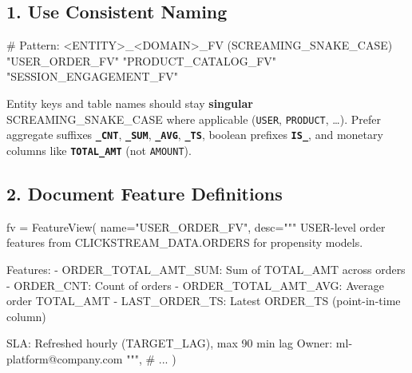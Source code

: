 \documentclass[
  letterpaper,
  DIV=11,
  numbers=noendperiod]{scrreprt}
\newenvironment{Shaded}{\begin{snugshade}}{\end{snugshade}}
\newcommand{\CommentTok}[1]{\textcolor[rgb]{0.37,0.37,0.37}{#1}}
\newcommand{\NormalTok}[1]{\textcolor[rgb]{0.00,0.23,0.31}{#1}}
\newcommand{\OperatorTok}[1]{\textcolor[rgb]{0.37,0.37,0.37}{#1}}
\newcommand{\StringTok}[1]{\textcolor[rgb]{0.13,0.47,0.30}{#1}}
\begin{document}
\hypertarget{use-consistent-naming}{%
\subsection{1. Use Consistent Naming}\label{use-consistent-naming}}

\begin{Shaded}
\begin{Highlighting}[]
\CommentTok{\# Pattern: \textless{}ENTITY\textgreater{}\_\textless{}DOMAIN\textgreater{}\_FV (SCREAMING\_SNAKE\_CASE)}
\CommentTok{"USER\_ORDER\_FV"}
\CommentTok{"PRODUCT\_CATALOG\_FV"}
\CommentTok{"SESSION\_ENGAGEMENT\_FV"}
\end{Highlighting}
\end{Shaded}

Entity keys and table names should stay \textbf{singular}
SCREAMING\_SNAKE\_CASE where applicable (\texttt{USER},
\texttt{PRODUCT}, \ldots). Prefer aggregate suffixes
\textbf{\texttt{\_CNT}}, \textbf{\texttt{\_SUM}},
\textbf{\texttt{\_AVG}}, \textbf{\texttt{\_TS}}, boolean prefixes
\textbf{\texttt{IS\_}}, and monetary columns like
\textbf{\texttt{TOTAL\_AMT}} (not \texttt{AMOUNT}).

\hypertarget{document-feature-definitions}{%
\subsection{2. Document Feature
Definitions}\label{document-feature-definitions}}

\begin{Shaded}
\begin{Highlighting}[]
\NormalTok{fv }\OperatorTok{=}\NormalTok{ FeatureView(}
\NormalTok{    name}\OperatorTok{=}\StringTok{"USER\_ORDER\_FV"}\NormalTok{,}
\NormalTok{    desc}\OperatorTok{=}\StringTok{"""}
\StringTok{    USER{-}level order features from CLICKSTREAM\_DATA.ORDERS for propensity models.}

\StringTok{    Features:}
\StringTok{    {-} ORDER\_TOTAL\_AMT\_SUM: Sum of TOTAL\_AMT across orders}
\StringTok{    {-} ORDER\_CNT: Count of orders}
\StringTok{    {-} ORDER\_TOTAL\_AMT\_AVG: Average order TOTAL\_AMT}
\StringTok{    {-} LAST\_ORDER\_TS: Latest ORDER\_TS (point{-}in{-}time column)}

\StringTok{    SLA: Refreshed hourly (TARGET\_LAG), max 90 min lag}
\StringTok{    Owner: ml{-}platform@company.com}
\StringTok{    """}\NormalTok{,}
    \CommentTok{\# ...}
\NormalTok{)}
\end{Highlighting}
\end{Shaded}
\end{document}
